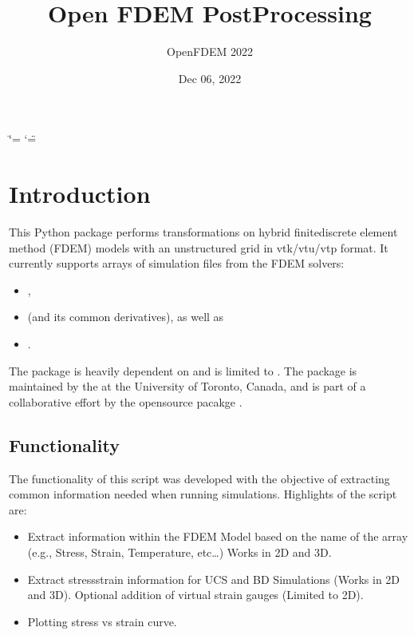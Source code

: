 \documentclass[letterpaper,10pt,english]{sphinxmanual}
\title{Open FDEM Post\sphinxhyphen{}Processing}
\date{Dec 06, 2022}
\author{OpenFDEM 2022}
\begin{document}
\ifdefined\shorthandoff
  \ifnum\catcode`\=\string=\active\shorthandoff{=}\fi
  \ifnum\catcode`\"=\active{}\fi
\fi

\pagestyle{empty}
\sphinxmaketitle
\pagestyle{plain}
\sphinxtableofcontents
\pagestyle{normal}
\label{\detokenize{index::doc}}


\sphinxstepscope


\chapter{Introduction}
\label{\detokenize{postprocessing_intro:introduction}}\label{\detokenize{postprocessing_intro::doc}}
\sphinxAtStartPar
This Python package performs transformations on hybrid finite\sphinxhyphen{}discrete element method (FDEM) models with an unstructured grid in vtk/vtu/vtp format. It currently supports arrays of simulation files from the FDEM solvers:
\begin{itemize}
\item {} 
\sphinxAtStartPar
{},

\item {} 
\sphinxAtStartPar
{} (and its common derivatives), as well as

\item {} 
\sphinxAtStartPar
{}.

\end{itemize}

\sphinxAtStartPar
The package is heavily dependent on  and is limited to . The package is maintained by the  at the University of Toronto, Canada, and is part of a collaborative effort by the open\sphinxhyphen{}source pacakge .


\section{Functionality}
\label{\detokenize{postprocessing_intro:functionality}}
\sphinxAtStartPar
The functionality of this script was developed with the objective of extracting common information needed when running simulations. Highlights of the script are:
\begin{itemize}
\item {} 
\sphinxAtStartPar
Extract information within the FDEM Model based on the name of the array (e.g., Stress, Strain, Temperature, etc…) Works in 2D and 3D.

\item {} 
\sphinxAtStartPar
Extract stress\sphinxhyphen{}strain information for UCS and BD Simulations (Works in 2D and 3D). Optional addition of virtual strain gauges (Limited to 2D).

\item {} 
\sphinxAtStartPar
Plotting stress vs strain curve.

\end{itemize}
\end{document}
